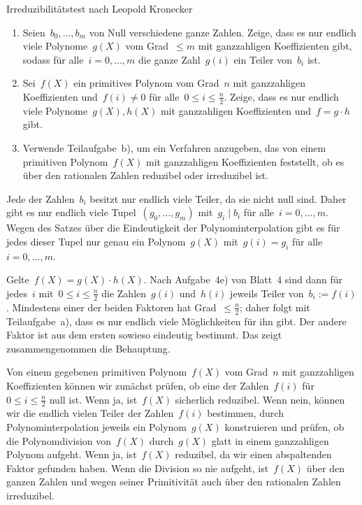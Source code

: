 \documentclass{algblatt}
\begin{document}
\begin{aufgabe}{Irreduzibilitätstest nach Leopold Kronecker}
\begin{enumerate}
\item Seien~$b_0,\ldots,b_m$ von Null verschiedene ganze Zahlen. Zeige, dass es
nur endlich viele Polynome~$g(X)$ vom Grad~$\leq m$ mit ganzzahligen Koeffizienten
gibt, sodass für alle~$i = 0,\ldots,m$ die ganze Zahl~$g(i)$ ein Teiler
von~$b_i$ ist.
\item Sei~$f(X)$ ein primitives Polynom vom Grad~$n$ mit ganzzahligen
Koeffizienten und~$f(i) \neq 0$ für alle~$0 \leq i \leq \frac{n}{2}$. Zeige,
dass es nur endlich viele Polynome~$g(X), h(X)$ mit ganzzahligen Koeffizienten
und~$f = g \cdot h$ gibt.
\item Verwende Teilaufgabe~b), um ein Verfahren anzugeben, das von einem
primitiven Polynom~$f(X)$ mit ganzzahligen Koeffizienten feststellt, ob es
über den rationalen Zahlen reduzibel oder irreduzibel ist.
\end{enumerate}

\begin{loesungE}
\item Jede der Zahlen~$b_i$ besitzt nur endlich viele Teiler, da sie nicht null
sind. Daher gibt es nur endlich viele Tupel~$(g_0,\ldots,g_m)$ mit~$g_i \mid
b_i$ für alle~$i = 0,\ldots,m$. Wegen des Satzes über die Eindeutigkeit der
Polynominterpolation gibt es für jedes dieser Tupel nur genau ein Polynom~$g(X)$ mit~$g(i)
= g_i$ für alle~$i = 0,\ldots,m$.

\item Gelte~$f(X) = g(X) \cdot h(X)$.
Nach Aufgabe~4e) von Blatt~4 sind dann
für jedes~$i$ mit~$0 \leq i \leq \frac{n}{2}$ die Zahlen~$g(i)$ und~$h(i)$
jeweils Teiler von~$b_i := f(i)$. Mindestens einer der beiden Faktoren hat
Grad~$\leq \frac{n}{2}$; daher folgt mit Teilaufgabe~a), dass es nur endlich
viele Möglichkeiten für ihn gibt. Der andere Faktor ist aus dem ersten sowieso
eindeutig bestimmt. Das zeigt zusammengenommen die Behauptung.

\item Von einem gegebenen primitiven Polynom~$f(X)$ vom Grad~$n$ mit ganzzahligen
Koeffizienten können wir zunächst prüfen, ob eine der Zahlen~$f(i)$ für~$0 \leq i
\leq \frac{n}{2}$ null ist. Wenn ja, ist~$f(X)$ sicherlich reduzibel. Wenn
nein, können wir die endlich vielen Teiler der Zahlen~$f(i)$ bestimmen, durch
Polynominterpolation jeweils ein Polynom~$g(X)$ konstruieren und prüfen, ob die
Polynomdivision von~$f(X)$ durch~$g(X)$ glatt in einem ganzzahligen Polynom
aufgeht. Wenn ja, ist~$f(X)$ reduzibel, da wir einen abspaltenden Faktor
gefunden haben. Wenn die Division so nie aufgeht, ist~$f(X)$ über den ganzen
Zahlen und wegen seiner Primitivität auch über den rationalen Zahlen
irreduzibel.
\end{loesungE}
\end{aufgabe}
\end{document}
